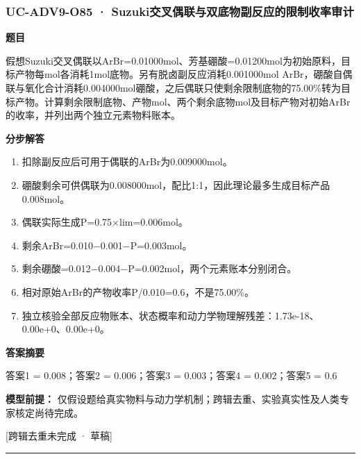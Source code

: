 \documentclass[UTF8,11pt,a4paper]{ctexart}
\begin{document}
\subsubsection*{UC-ADV9-O85 · Suzuki交叉偶联与双底物副反应的限制收率审计}
\noindent\textbf{题目}\par
假想Suzuki交叉偶联以ArBr=0.01000mol、芳基硼酸=0.01200mol为初始原料，目标产物每mol各消耗1mol底物。另有脱卤副反应消耗0.001000mol ArBr，硼酸自偶联与氧化合计消耗0.004000mol硼酸，之后偶联只使剩余限制底物的75.00\%转为目标产物。计算剩余限制底物、产物mol、两个剩余底物mol及目标产物对初始ArBr的收率，并列出两个独立元素物料账本。\par
\medskip\noindent\textbf{分步解答}
\begin{enumerate}
\item 扣除副反应后可用于偶联的ArBr为0.009000mol。
\item 硼酸剩余可供偶联为0.008000mol，配比1:1，因此理论最多生成目标产品0.008mol。
\item 偶联实际生成P=0.75×lim=0.006mol。
\item 剩余ArBr=0.010−0.001−P=0.003mol。
\item 剩余硼酸=0.012−0.004−P=0.002mol，两个元素账本分别闭合。
\item 相对原始ArBr的产物收率P/0.010=0.6，不是75.00\%。
\item 独立核验全部反应物账本、状态概率和动力学物理解残差：1.73e-18、0.00e+0、0.00e+0。
\end{enumerate}
\noindent\textbf{答案摘要}\par
答案1 = 0.008；答案2 = 0.006；答案3 = 0.003；答案4 = 0.002；答案5 = 0.6\par
\noindent\textbf{模型前提：}
仅假设题给真实物料与动力学机制；跨辑去重、实验真实性及人类专家核定尚待完成。\par
\noindent\textcolor{red!65!black}{[跨辑去重未完成 · 草稿]} \par
\medskip\hrule\medskip
{}
\end{document}
